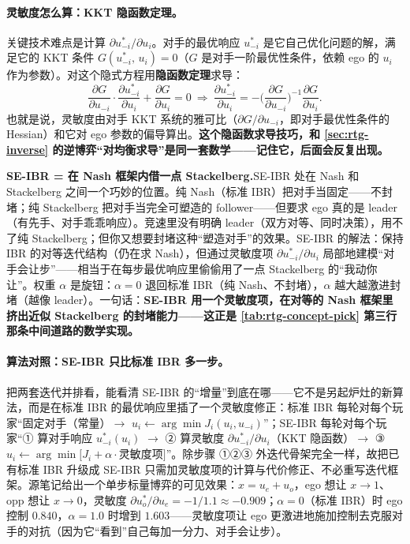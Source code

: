\paragraph{灵敏度怎么算：KKT 隐函数定理。}
关键技术难点是计算 $\partial u_{-i}^*/\partial u_i$。对手的最优响应 $u_{-i}^*$ 是它自己优化问题的解，满足它的 KKT 条件 $G(u_{-i}^*,\,u_i)=0$（$G$ 是对手一阶最优性条件，依赖 ego 的 $u_i$ 作为参数）。对这个隐式方程用\textbf{隐函数定理}求导：
\begin{equation}
  \frac{\partial G}{\partial u_{-i}}\cdot\frac{\partial u_{-i}^*}{\partial u_i}+\frac{\partial G}{\partial u_i}=0
  \ \Longrightarrow\
  \frac{\partial u_{-i}^*}{\partial u_i}=-\Big(\frac{\partial G}{\partial u_{-i}}\Big)^{-1}\frac{\partial G}{\partial u_i}.
  \label{eq:rtg-seibr-sensitivity}
\end{equation}
也就是说，灵敏度由对手 KKT 系统的雅可比（$\partial G/\partial u_{-i}$，即对手最优性条件的 Hessian）和它对 ego 参数的偏导算出。\textbf{这个隐函数求导技巧，和 \cref{sec:rtg-inverse} 的逆博弈“对均衡求导”是同一套数学——记住它，后面会反复出现。}

\begin{insight}
\textbf{SE-IBR = 在 Nash 框架内借一点 Stackelberg.}\;SE-IBR 处在 Nash 和 Stackelberg 之间一个巧妙的位置。纯 Nash（标准 IBR）把对手当固定——不封堵；纯 Stackelberg 把对手当完全可塑造的 follower——但要求 ego 真的是 leader（有先手、对手乖乖响应）。竞速里没有明确 leader（双方对等、同时决策），用不了纯 Stackelberg；但你又想要封堵这种“塑造对手”的效果。SE-IBR 的解法：保持 IBR 的对等迭代结构（仍在求 Nash），但通过灵敏度项 $\partial u_{-i}^*/\partial u_i$ 局部地建模“对手会让步”——相当于在每步最优响应里偷偷用了一点 Stackelberg 的“我动你让”。权重 $\alpha$ 是旋钮：$\alpha=0$ 退回标准 IBR（纯 Nash、不封堵），$\alpha$ 越大越激进封堵（越像 leader）。一句话：\textbf{SE-IBR 用一个灵敏度项，在对等的 Nash 框架里挤出近似 Stackelberg 的封堵能力——这正是 \cref{tab:rtg-concept-pick} 第三行那条中间道路的数学实现。}
\end{insight}

\paragraph{算法对照：SE-IBR 只比标准 IBR 多一步。}
把两套迭代并排看，能看清 SE-IBR 的“增量”到底在哪——它不是另起炉灶的新算法，而是在标准 IBR 的最优响应里插了一个灵敏度修正：标准 IBR 每轮对每个玩家“固定对手（常量）$\to$ $u_i\leftarrow\arg\min J_i(u_i,u_{-i})$”；SE-IBR 每轮对每个玩家“① 算对手响应 $u_{-i}^*(u_i)$ $\to$ ② 算灵敏度 $\partial u_{-i}^*/\partial u_i$（KKT 隐函数）$\to$ ③ $u_i\leftarrow\arg\min[J_i+\alpha\cdot$灵敏度项$]$”。除步骤 ①②③ 外迭代骨架完全一样，故把已有标准 IBR 升级成 SE-IBR 只需加灵敏度项的计算与代价修正、不必重写迭代框架。源笔记给出一个单步标量博弈的可见效果：$x=u_e+u_o$，ego 想让 $x\to1$、opp 想让 $x\to0$，灵敏度 $\partial u_o^*/\partial u_e=-1/1.1\approx-0.909$；$\alpha=0$（标准 IBR）时 ego 控制 $0.840$，$\alpha=1.0$ 时增到 $1.603$——灵敏度项让 ego 更激进地施加控制去克服对手的对抗（因为它“看到”自己每加一分力、对手会让步）\cite{spica2020realtime}。

